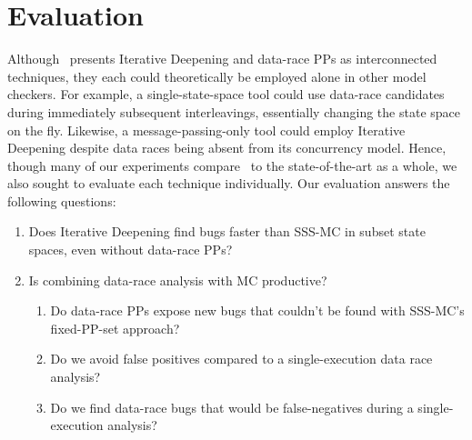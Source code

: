 
\section{Evaluation}

Although \quicksand~presents Iterative Deepening and data-race PPs as interconnected techniques, they each could theoretically be employed alone in other model checkers.
For example, a single-state-space tool could use data-race candidates during immediately subsequent interleavings, essentially changing the state space on the fly.
Likewise, a message-passing-only tool could employ Iterative Deepening despite data races being absent from its concurrency model.
Hence, though many of our experiments compare \quicksand~to the state-of-the-art as a whole,
we also sought to evaluate each technique individually.
Our evaluation answers the following questions:
\begin{enumerate}
	\item Does Iterative Deepening find bugs faster than SSS-MC in subset state spaces, even without data-race PPs?
	\item Is combining data-race analysis with MC productive?
		\begin{enumerate}
			\item Do data-race PPs expose new bugs that couldn't be found with SSS-MC's fixed-PP-set approach?
			\item Do we avoid false positives compared to a single-execution data race analysis?
			\item Do we find data-race bugs that would be false-negatives during a single-execution analysis?%
		\end{enumerate}
\end{enumerate}

